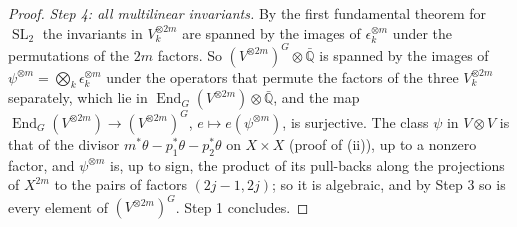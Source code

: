 \documentclass[11pt,reqno]{amsart}
\theoremstyle{plain}
\theoremstyle{definition}
\theoremstyle{remark}
\newcommand{\QQ}{\mathbb{Q}}
\DeclareMathOperator{\End}{End}
\DeclareMathOperator{\SL}{SL}
\begin{document}
\begin{proof}
\emph{Step 4: all multilinear invariants.} By the first fundamental theorem
for $\SL_{2}$ the invariants in $V_{k}^{\otimes2m}$ are spanned by the images
of $\epsilon_{k}^{\otimes m}$ under the permutations of the $2m$ factors. So
$(V^{\otimes2m})^{G}\otimes\bar{\QQ}$ is spanned by the images of
$\psi^{\otimes m}=\bigotimes_{k}\epsilon_{k}^{\otimes m}$ under the operators
that permute the factors of the three $V_{k}^{\otimes2m}$ separately, which
lie in $\End_{G}(V^{\otimes2m})\otimes\bar{\QQ}$, and the map
$\End_{G}(V^{\otimes2m})\to(V^{\otimes2m})^{G}$, $e\mapsto e(\psi^{\otimes m})$,
is surjective. The class $\psi$ in $V\otimes V$ is that of the divisor
$m^{*}\theta-p_{1}^{*}\theta-p_{2}^{*}\theta$ on $X\times X$ (proof of
(ii)), up to a nonzero factor, and $\psi^{\otimes m}$ is,
up to sign, the product of its pull-backs along the projections of $X^{2m}$
to the pairs of factors $(2j-1,2j)$; so it is algebraic, and by Step 3 so is
every element of $(V^{\otimes2m})^{G}$. Step 1 concludes.
\end{proof}
\end{document}
